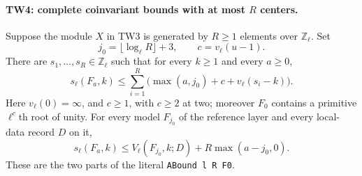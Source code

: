 \paragraph{TW4: complete coinvariant bounds with at most \(R\) centers.}
\label{claim:TW4}
Suppose the module $X$ in TW3 is generated by $R\ge1$ elements
over $\mathbb Z_\ell$.  Set
\[
 j_0=\lfloor\log_\ell R\rfloor+3,\qquad
 c=v_\ell(u-1).
 \tag{TW.15}
\]
There are $s_1,\ldots,s_R\in\mathbb Z_\ell$ such that
for every $k\ge1$ and every $a\ge0$,
\[
 s_\ell(F_a,k)\le
   \sum_{i=1}^R\bigl(\max(a,j_0)+c+v_\ell(s_i-k)\bigr).
 \tag{TW.16}
\]
Here $v_\ell(0)=\infty$, and
$c\ge1$, with $c\ge2$ at two; moreover $F_0$ contains a
primitive $\ell^c$th root of unity.
For every model $F_{j_0}$ of the reference layer and every
local-data record $D$ on it,
\[
 s_\ell(F_a,k)\le
 V_\ell(F_{j_0},k;D)+R\max(a-j_0,0).                    \tag{TW.17}
\]
These are the two parts of the literal \texttt{ABound l R F0}.

